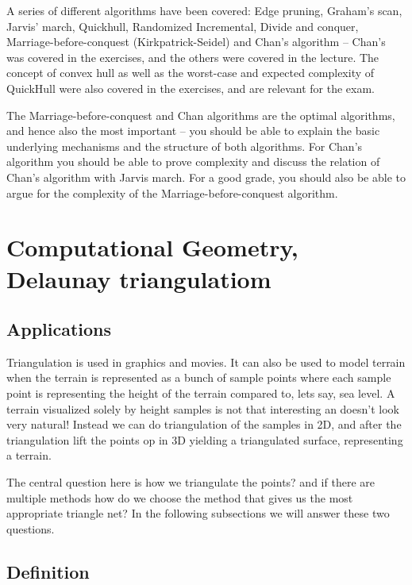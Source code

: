 \documentclass[10pt]{article}
\begin{document}
A series of different algorithms have been covered: Edge pruning, Graham's scan, Jarvis' march, Quickhull, Randomized Incremental, Divide and conquer, Marriage-before-conquest (Kirkpatrick-Seidel) and Chan's algorithm -- Chan's was covered in the exercises, and the others were covered in the lecture. The concept of convex hull as well as the worst-case and expected complexity of QuickHull were also covered in the exercises, and are relevant for the exam.

The Marriage-before-conquest and Chan algorithms are the optimal algorithms, and hence also the most important -- you should be able to explain the basic underlying mechanisms and the structure of both algorithms. For Chan's algorithm you should be able to prove complexity and discuss the relation of Chan's algorithm with Jarvis march. For a good grade, you should also be able to argue for the complexity of the Marriage-before-conquest algorithm.




\section{Computational Geometry, Delaunay triangulatiom} %
\label{sec:computational_geometry_delaunay_triangulatiom}


\subsection{Applications} %
\label{sub:applications}
Triangulation is used in graphics and movies. It can also be used to model terrain when the terrain is represented as a bunch of sample points where each sample point is representing the height of the terrain compared to, lets say, sea level. A terrain visualized solely by height samples is not that interesting an doesn't look very natural! Instead we can do triangulation of the samples in 2D, and after the triangulation lift the points op in 3D yielding a triangulated surface, representing a terrain. 

The central question here is how we triangulate the points? and if there are multiple methods how do we choose the method that gives us the most appropriate triangle net? In the following subsections we will answer these two questions.


\subsection{Definition} %
\label{sub:definition}
\end{document}
